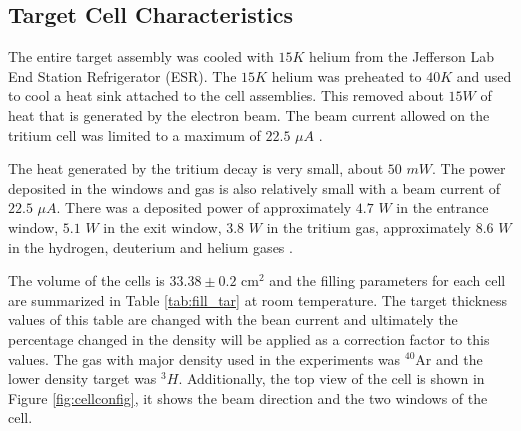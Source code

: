 \documentclass[final,5p,times,twocolumn,balance]{elsarticle}
\begin{document}
\subsection{Target Cell Characteristics}

The entire target assembly was cooled with $15K$ helium from the Jefferson Lab End Station Refrigerator (ESR). The $15K$ helium was preheated to $40K$ and used to cool a heat sink attached to the cell assemblies. This removed about $15W$ of heat that is generated by the electron beam. 
The beam current allowed on the tritium cell was limited to a maximum of $22.5$ $\mu A$ \cite{engreport}.

The heat generated by the tritium decay is very small, about $50$ $mW$. The power deposited in the windows and gas is also relatively 
small with a beam current of $22.5$ $\mu A$. There was a deposited power of approximately $4.7$ $W$ in the entrance window, $5.1$ $W$ 
in the exit window, $3.8$ $W$ in the tritium gas, approximately $8.6$ $W$ in the hydrogen, deuterium and helium gases \cite{celldes}.
 
The volume of the cells is  $33.38 \pm 0.2$ cm$^{2}$ and the filling parameters for each cell are summarized in Table \ref{tab:fill_tar} at room temperature. The target thickness values of this table are changed with the bean current and ultimately the percentage changed in the density will be applied as a correction factor to this values. The gas with major density used in the experiments was $^{40}$Ar and the lower density target was $^{3}H$.  Additionally, the top view of the cell is shown in Figure \ref{fig:cellconfig},  it shows the beam direction and the two windows of the cell.
\end{document}
